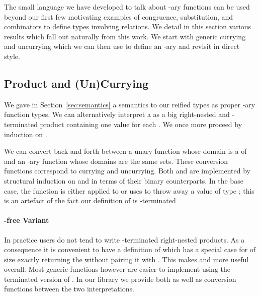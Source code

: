 {The small language we have developed to talk about -ary functions can
be used beyond our first few motivating examples of congruence, substitution,
and combinators to define types involving relations. We detail in this section
various results which fall out naturally from this work. We start with generic
currying and uncurrying which we can then use to define an -ary 
and revisit  in direct style.

\subsection{Product and (Un)Currying}

We gave in Section~\ref{sec:semantics} a semantics to our reified types as
proper -ary function types. We can alternatively interpret a 
as a big right-nested and -terminated product containing one value for
each . We once more proceed by induction on .


We can convert back and forth between a unary function whose domain is a
 of  and an -ary function whose domains are the
same sets. These conversion functions correspond to currying and uncurrying.
Both  and  are implemented by structural induction
on  and in terms of their binary counterparts. In the base case, the
function is either applied to  or uses  to throw away a
value of type ; this is an artefact of the fact our definition of
 is -terminated


\paragraph{-free Variant} In practice users do not tend to write
-terminated right-nested products. As a consequence it is convenient
to have a definition of  which has a special case for 
of size exactly  returning the  without pairing it with .
This makes  and  more useful overall. Most generic
functions however are easier to implement using the -terminated version
of . In our library we provide both as well as conversion
functions between the two interpretations.

}
